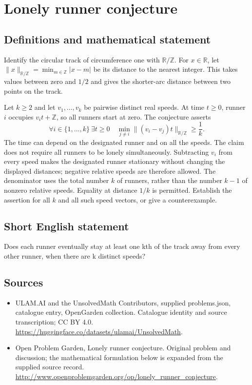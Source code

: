 \documentclass[11pt,a4paper]{article}
\begin{document}
\section*{Lonely runner conjecture}\label{statement}

\subsection{Definitions and mathematical statement}
Identify the circular track of circumference one with $\mathbb R/\mathbb Z$.
For $x\in\mathbb R$, let $\|x\|_{\mathbb R/\mathbb Z}
=\min_{m\in\mathbb Z}|x-m|$ be its distance to the nearest integer.
This takes values between zero and $1/2$ and gives the shorter-arc
distance between two points on the track.

Let $k\ge2$ and let $v_1,\ldots,v_k$ be pairwise distinct real speeds.
At time $t\ge0$, runner $i$ occupies $v_it+\mathbb Z$, so all runners
start at zero. The conjecture asserts
\[
 \forall i\in\{1,\ldots,k\}\ \exists t\ge0\quad
 \min_{j\ne i}\|(v_i-v_j)t\|_{\mathbb R/\mathbb Z}\ge\frac1k.
\]
The time can depend on the designated runner and on all the speeds.
The claim does not require all runners to be lonely simultaneously.
Subtracting $v_i$ from every speed makes the designated runner stationary
without changing the displayed distances; negative relative speeds are
therefore allowed. The denominator uses the total number $k$ of runners,
rather than the number $k-1$ of nonzero relative speeds. Equality at
distance $1/k$ is permitted. Establish the assertion for all $k$ and
all such speed vectors, or give a counterexample.
\subsection{Short English statement}
Does each runner eventually stay at least one kth of the track away from every other runner, when there are k distinct speeds?
\subsection{Sources}
\begin{itemize}
\item[S1] ULAM.AI and the UnsolvedMath Contributors, supplied problems.json, catalogue entry, OpenGarden collection. Catalogue identity and source transcription; CC BY 4.0.
\url{https://huggingface.co/datasets/ulamai/UnsolvedMath}.
\item[S2] Open Problem Garden, Lonely runner conjecture. Original problem and discussion; the mathematical formulation below is expanded from the supplied source record.
\url{http://www.openproblemgarden.org/op/lonely_runner_conjecture}.
\end{itemize}
\end{document}
